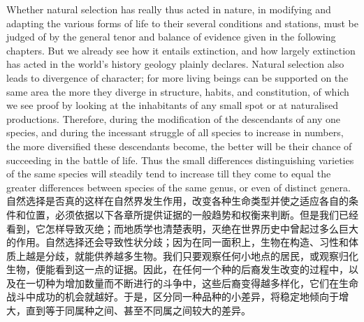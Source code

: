 \darwinpair
{Whether natural selection has really thus acted in nature, in modifying and adapting the various forms of life to their several conditions and stations, must be judged of by the general tenor and balance of evidence given in the following chapters. But we already see how it entails extinction, and how largely extinction has acted in the world's history geology plainly declares. Natural selection also leads to divergence of character; for more living beings can be supported on the same area the more they diverge in structure, habits, and constitution, of which we see proof by looking at the inhabitants of any small spot or at naturalised productions. Therefore, during the modification of the descendants of any one species, and during the incessant struggle of all species to increase in numbers, the more diversified these descendants become, the better will be their chance of succeeding in the battle of life. Thus the small differences distinguishing varieties of the same species will steadily tend to increase till they come to equal the greater differences between species of the same genus, or even of distinct genera.}
{自然选择是否真的这样在自然界发生作用，改变各种生命类型并使之适应各自的条件和位置，必须依据以下各章所提供证据的一般趋势和权衡来判断。但是我们已经看到，它怎样导致灭绝；而地质学也清楚表明，灭绝在世界历史中曾起过多么巨大的作用。自然选择还会导致性状分歧；因为在同一面积上，生物在构造、习性和体质上越是分歧，就能供养越多生物。我们只要观察任何小地点的居民，或观察归化生物，便能看到这一点的证据。因此，在任何一个种的后裔发生改变的过程中，以及在一切种为增加数量而不断进行的斗争中，这些后裔变得越多样化，它们在生命战斗中成功的机会就越好。于是，区分同一种品种的小差异，将稳定地倾向于增大，直到等于同属种之间、甚至不同属之间较大的差异。}

